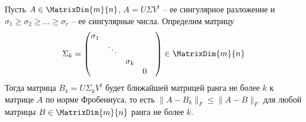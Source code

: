 \begin{claim}
Пусть $A\in\MatrixDim{m}{n}$, $A = U \Sigma V^t$ -- ее сингулярное разложение и $\sigma_1\geqslant \sigma_2\geqslant \ldots \geqslant \sigma_r$ -- ее сингулярные числа.
Определим матрицу
\[
\Sigma_k =
\begin{pmatrix}
{\sigma_1}&{}&{}&{}&{}\\
{}&{\ddots}&{}&{}&{}\\
{}&{}&{\sigma_k}&{}&{}\\
{}&{}&{}&{0}&{}\\
\end{pmatrix}
\in \MatrixDim{m}{n}
\]
Тогда матрица $B_k = U\Sigma_k V^t$ будет ближайшей матрицей ранга не более $k$ к матрице $A$ по норме Фробениуса, то есть $\|A - B_k\|_F\leqslant \|A - B\|_F$ для любой матрицы $B\in \MatrixDim{m}{n}$ ранга не более $k$.
\end{claim}
